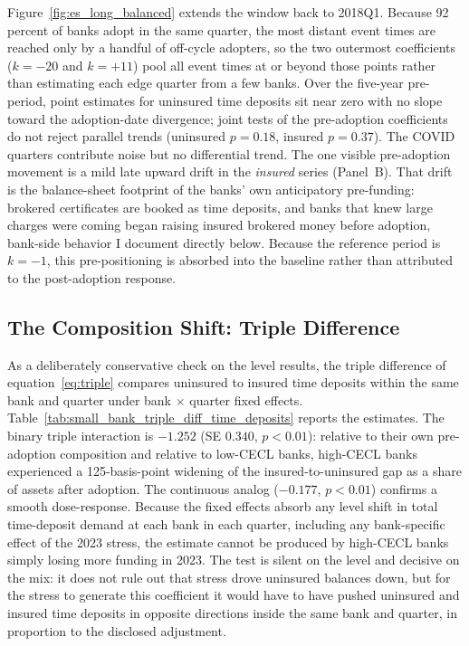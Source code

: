Figure~\ref{fig:es_long_balanced} extends the window back to 2018Q1.
Because 92 percent of banks adopt in the same quarter, the most distant
event times are reached only by a handful of off-cycle adopters, so the
two outermost coefficients ($k=-20$ and $k=+11$) pool all event times
at or beyond those points rather than estimating each edge quarter from
a few banks.  Over the five-year pre-period, point estimates for
uninsured time deposits sit near zero with no slope toward the
adoption-date divergence; joint tests of the pre-adoption coefficients
do not reject parallel trends (uninsured $p=0.18$, insured $p=0.37$).
The COVID quarters contribute noise but no differential trend.  The one
visible pre-adoption movement is a mild late upward drift in the
\emph{insured} series (Panel~B).  That drift is the balance-sheet
footprint of the banks' own anticipatory pre-funding: brokered
certificates are booked as time deposits, and banks that knew large
charges were coming began raising insured brokered money before
adoption, bank-side behavior I document directly below.  Because the
reference period is $k=-1$, this pre-positioning is absorbed into the
baseline rather than attributed to the post-adoption response.

\subsection{The Composition Shift: Triple Difference}
\label{sec:results:composition}

As a deliberately conservative check on the level results, the triple
difference of equation~\eqref{eq:triple} compares uninsured to insured
time deposits within the same bank and quarter under bank $\times$
quarter fixed effects.
Table~\ref{tab:small_bank_triple_diff_time_deposits} reports the
estimates.  The binary triple interaction is $-1.252$ (SE $0.340$,
$p<0.01$): relative to their own pre-adoption composition and relative
to low-CECL banks, high-CECL banks experienced a 125-basis-point
widening of the insured-to-uninsured gap as a share of assets after
adoption.  The continuous analog ($-0.177$, $p<0.01$) confirms a
smooth dose-response.  Because the fixed effects absorb any level
shift in total time-deposit demand at each bank in each quarter,
including any bank-specific effect of the 2023 stress, the estimate
cannot be produced by high-CECL banks simply losing more funding in
2023.  The test is silent on the level and decisive on the mix: it
does not rule out that stress drove uninsured balances down, but for
the stress to generate this coefficient it would have to have pushed
uninsured and insured time deposits in opposite directions inside the
same bank and quarter, in proportion to the disclosed adjustment.


